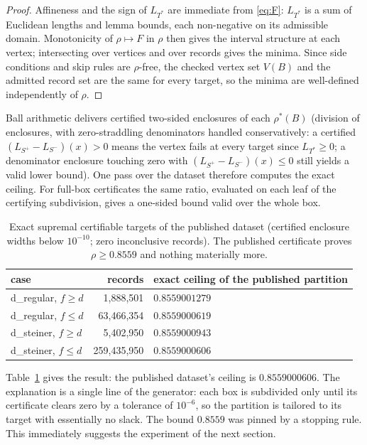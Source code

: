 \documentclass[11pt]{article}
\newcommand{\rr}{\rho}
\newcommand{\ts}{L_{T^*}}
\newcommand{\snet}{L_{S^+}\!-\!L_{S^-}}
\begin{document}
\begin{proof}
Affineness and the sign of $\ts$ are immediate from
\eqref{eq:F}: $\ts$ is a sum of Euclidean lengths and lemma
bounds, each non-negative on its admissible domain. Monotonicity of
$\rr \mapsto F$ in $\rr$ then gives the interval structure at each
vertex; intersecting over vertices and over records gives the minima.
Since side conditions and skip rules are $\rr$-free, the checked vertex
set $V(B)$ and the admitted record set are the same for every target,
so the minima are well-defined independently of $\rr$.
\end{proof}

Ball arithmetic delivers certified two-sided enclosures of each
$\rr^\ast(B)$ (division of enclosures, with zero-straddling denominators
handled conservatively: a certified $(\snet)(x) > 0$ means the vertex
fails at every target since $\ts \ge 0$; a denominator enclosure touching
zero with $(\snet)(x) \le 0$ still yields a valid lower bound). One pass
over the dataset therefore computes the exact ceiling. For full-box
certificates the same ratio, evaluated on each leaf of the certifying
subdivision, gives a one-sided bound valid over the whole box.

\begin{table}[t]
\centering
\begin{tabular}{lrl}
\toprule
case & records & exact ceiling of the published partition \\
\midrule
d\_regular, $f\ge d$ & 1{,}888{,}501 & $0.8559001279$ \\
d\_regular, $f\le d$ & 63{,}466{,}354 & $0.8559000619$ \\
d\_steiner, $f\ge d$ & 5{,}402{,}950 & $0.8559000943$ \\
d\_steiner, $f\le d$ & 259{,}435{,}950 & $\mathbf{0.8559000606}$ \\
\bottomrule
\end{tabular}
\caption{Exact supremal certifiable targets of the published dataset
(certified enclosure widths below $10^{-10}$; zero inconclusive
records). The published certificate proves $\rr \ge 0.8559$ and nothing
materially more.}
\label{tab:ceilings}
\end{table}

Table~\ref{tab:ceilings} gives the result: the published dataset's
ceiling is $0.8559000606$. The explanation is a single line of the
generator: each box is subdivided only until its certificate clears zero
by a tolerance of $10^{-6}$, so the partition is tailored to its target
with essentially no slack. The bound $0.8559$ was pinned by a stopping
rule. This immediately suggests the experiment of the next section.
\end{document}
